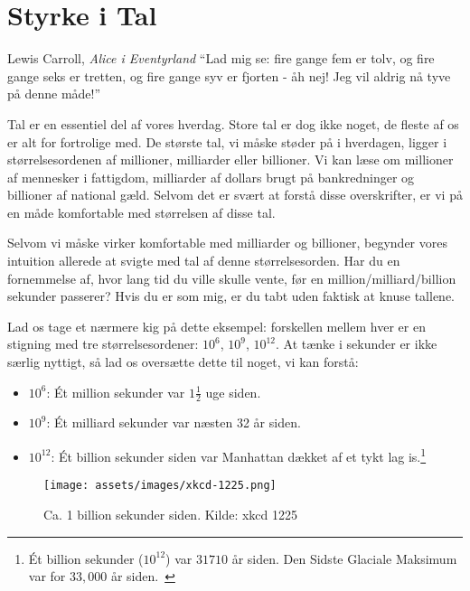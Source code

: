 \chapter{Styrke i Tal}
\label{les:15}

\begin{chapquote}{Lewis Carroll, \textit{Alice i Eventyrland}}
\enquote{Lad mig se: fire gange fem er tolv, og fire gange seks er tretten, 
og fire gange syv er fjorten - åh nej! Jeg vil aldrig nå tyve på denne måde!}
\end{chapquote}

Tal er en essentiel del af vores hverdag. Store tal er dog ikke noget, de 
fleste af os er alt for fortrolige med. De største tal, vi måske støder på 
i hverdagen, ligger i størrelsesordenen af millioner, milliarder eller 
billioner. Vi kan læse om millioner af mennesker i fattigdom, milliarder af 
dollars brugt på bankredninger og billioner af national gæld. Selvom det er 
svært at forstå disse overskrifter, er vi på en måde komfortable med 
størrelsen af disse tal.

Selvom vi måske virker komfortable med milliarder og billioner, begynder 
vores intuition allerede at svigte med tal af denne størrelsesorden. Har 
du en fornemmelse af, hvor lang tid du ville skulle vente, før en 
million/milliard/billion sekunder passerer? Hvis du er som mig, er du tabt 
uden faktisk at knuse tallene.

Lad os tage et nærmere kig på dette eksempel: forskellen mellem hver er en 
stigning med tre størrelsesordener: $10^6$, $10^9$, $10^{12}$. At tænke i
sekunder er ikke særlig nyttigt, så lad os oversætte dette til noget, vi 
kan forstå:

\begin{itemize}
  \item $10^6$: Ét million sekunder var $1 \frac{1}{2}$ uge siden.
  \item $10^9$: Ét milliard sekunder var næsten 32 år siden.
  \item $10^{12}$: Ét billion sekunder siden var Manhattan dækket af et tykt lag
  is.\footnote{Ét billion sekunder ($10^{12}$) var $31710$ år siden. Den Sidste 
  Glaciale Maksimum var for $33,000$ år siden.~\cite{wiki:LGM}}
\end{itemize}

\begin{figure}[htbp]
  \centering
  \texttt{[image: assets/images/xkcd-1225.png]}
  \caption{Ca. 1 billion sekunder siden. Kilde: xkcd 1225}
  \label{fig:xkcd-1225}
\end{figure}

